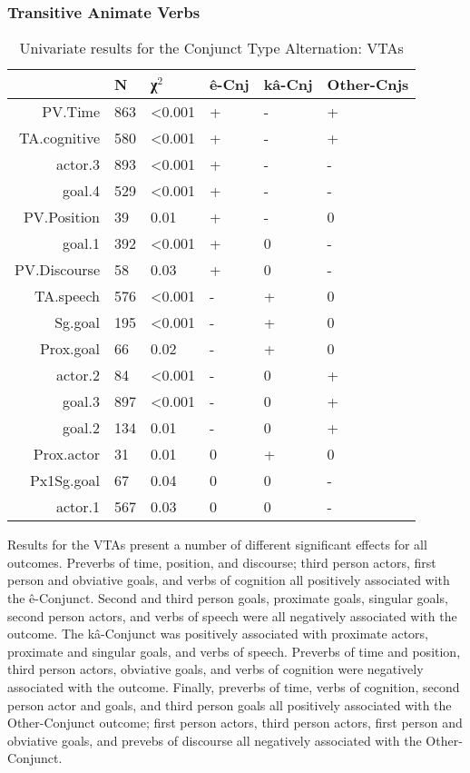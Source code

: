 \FloatBarrier

\subsubsection{Transitive Animate Verbs}

\begin{table}[H]
  \centering
  \footnotesize
\begin{tabular}{rlllll}
    \toprule
 & N & χ$^{2}$ & ê-Cnj & kâ-Cnj & Other-Cnjs \\
\midrule

PV.Time & 863 & \textless{}0.001 & + & - & + \\
TA.cognitive & 580 & \textless{}0.001 & + & - & + \\
actor.3 & 893 & \textless{}0.001 & + & - & - \\
goal.4 & 529 & \textless{}0.001 & + & - & - \\
PV.Position & 39 & 0.01 & + & - & 0 \\
goal.1 & 392 & \textless{}0.001 & + & 0 & - \\
PV.Discourse & 58 & 0.03 & + & 0 & - \\
TA.speech & 576 & \textless{}0.001 & - & + & 0 \\
Sg.goal & 195 & \textless{}0.001 & - & + & 0 \\
Prox.goal & 66 & 0.02 & - & + & 0 \\
actor.2 & 84 & \textless{}0.001 & - & 0 & + \\
goal.3 & 897 & \textless{}0.001 & - & 0 & + \\
goal.2 & 134 & 0.01 & - & 0 & + \\
Prox.actor & 31 & 0.01 & 0 & + & 0 \\
Px1Sg.goal & 67 & 0.04 & 0 & 0 & - \\
actor.1 & 567 & 0.03 & 0 & 0 & - \\

  \bottomrule
  \end{tabular}
  \caption{
   Univariate results for the Conjunct Type Alternation: VTAs \\ \label{tab:tacnjuni}
  }
\end{table}

Results for the VTAs present a number of different  significant effects for all outcomes. Preverbs of time, position, and discourse; third person actors, first person and obviative goals, and verbs of cognition all positively associated with the ê-Conjunct. Second and third person goals, proximate goals, singular goals, second person actors, and verbs of speech were all negatively associated with the outcome. The kâ-Conjunct was positively associated with proximate actors, proximate and singular goals, and verbs of speech. Preverbs of time and position, third person actors, obviative goals, and verbs of cognition were negatively associated with the outcome. Finally, preverbs of time, verbs of cognition, second person actor and goals, and third person goals all positively associated with the Other-Conjunct outcome; first person actors, third person actors, first person and obviative goals, and prevebs of discourse all negatively associated with the Other-Conjunct.
\FloatBarrier

